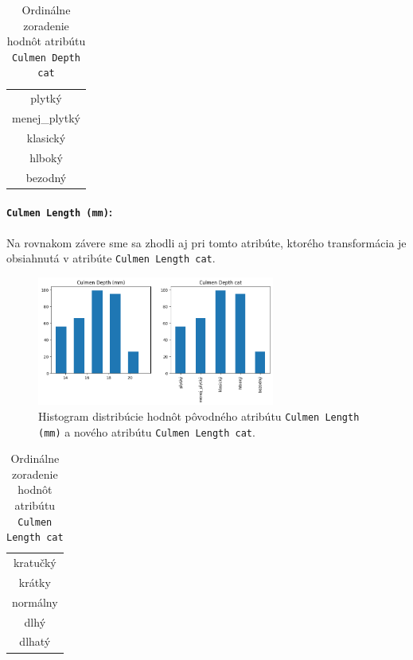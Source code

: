 \documentclass[10pt,xcolor=pdflatex,dvipsnames,table,oneside]{book}
\begin{document}
\begin{table}[h]
\centering
\begin{tabular}{|c|}
\hline
plytký        \\
menej\_plytký \\
klasický      \\
hlboký        \\
bezodný       \\ \hline
\end{tabular}
\caption{Ordinálne zoradenie hodnôt atribútu \texttt{Culmen Depth cat}}
\end{table}



\pagebreak
\paragraph{\texttt{Culmen Length (mm)}:} 
Na rovnakom závere sme sa zhodli aj pri tomto atribúte, ktorého transformácia je obsiahnutá v atribúte \texttt{Culmen Length cat}. 

\begin{figure}[h]
  \centering
  \includegraphics[width=7.8cm]{img/culmen_depth.png}
  \caption{Histogram distribúcie hodnôt pôvodného atribútu \texttt{Culmen Length (mm)} a nového atribútu \texttt{Culmen Length cat}.}
\end{figure}

\begin{table}[h]
\centering
\begin{tabular}{|c|}
\hline
kratučký                                 \\
krátky                                   \\
normálny                                 \\
dlhý                                     \\
dlhatý                                   \\ \hline
\end{tabular}
\caption{Ordinálne zoradenie hodnôt atribútu \texttt{Culmen Length cat}}
\end{table}
\end{document}
